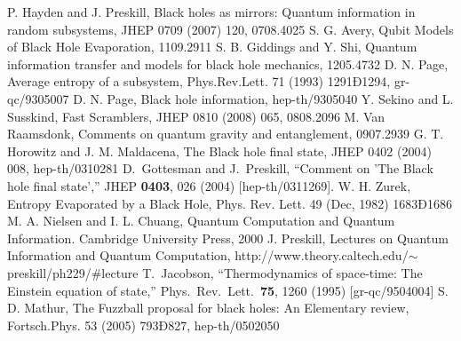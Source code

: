 \documentclass[12pt]{article}%
\begin{document}
\begin{thebibliography}{99}
 P. Hayden and J. Preskill, Black holes as mirrors: Quantum information in random subsystems, JHEP 0709 (2007) 120, 0708.4025
        S. G. Avery, Qubit Models of Black Hole Evaporation, 1109.2911
 S. B. Giddings and Y. Shi, Quantum information transfer and models for black hole mechanics, 1205.4732
        D. N. Page, Average entropy of a subsystem, Phys.Rev.Lett. 71 (1993) 1291Ð1294, gr-qc/9305007
  D. N. Page, Black hole information, hep-th/9305040
 Y. Sekino and L. Susskind, Fast Scramblers, JHEP 0810 (2008) 065, 0808.2096
  M. Van Raamsdonk, Comments on quantum gravity and entanglement, 0907.2939
 G. T. Horowitz and J. M. Maldacena, The Black hole final state, JHEP 0402 (2004) 008, hep-th/0310281
   D.~Gottesman and J.~Preskill, ``Comment on 'The Black hole final state',''  JHEP {\bf 0403}, 026 (2004)  [hep-th/0311269].
 W. H. Zurek, Entropy Evaporated by a Black Hole, Phys. Rev. Lett. 49 (Dec, 1982) 1683Ð1686
    M. A. Nielsen and I. L. Chuang, Quantum Computation and Quantum Information. Cambridge University Press, 2000
 J. Preskill, Lectures on Quantum Information and Quantum Computation, http://www.theory.caltech.edu/$\sim$preskill/ph229/$\#$lecture
  T.~Jacobson, ``Thermodynamics of space-time: The Einstein equation of state,''
  Phys.\ Rev.\ Lett.\  {\bf 75}, 1260 (1995) [gr-qc/9504004]  
        S. D. Mathur, The Fuzzball proposal for black holes: An Elementary review, Fortsch.Phys. 53 (2005) 793Ð827, hep-th/0502050


\end{thebibliography}


\end{document}
